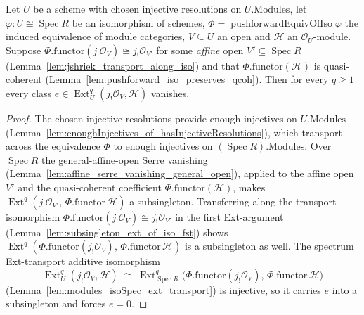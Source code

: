 \begin{lemma}

  \label{lem:ext_jShriekOU_eq_zero_of_specIso}
  Let \(U\) be a scheme with chosen injective resolutions on \(U.\mathrm{Modules}\), let
  \(\varphi : U \cong \operatorname{Spec} R\) be an isomorphism of schemes,
  \(\Phi = \operatorname{pushforwardEquivOfIso}\varphi\) the induced equivalence of module categories,
  \(V \subseteq U\) an open and \(\mathcal{H}\) an \(\mathcal{O}_U\)-module. Suppose
  \(\Phi.\mathrm{functor}(j_!\mathcal{O}_V) \cong j_!\mathcal{O}_{V'}\) for some \emph{affine} open
  \(V' \subseteq \operatorname{Spec} R\) (Lemma~\ref{lem:jshriek_transport_along_iso}) and that
  \(\Phi.\mathrm{functor}(\mathcal{H})\) is quasi-coherent
  (Lemma~\ref{lem:pushforward_iso_preserves_qcoh}). Then for every \(q \geq 1\) every class
  \(e \in \operatorname{Ext}^q_U(j_!\mathcal{O}_V, \mathcal{H})\) vanishes.
\end{lemma}
\begin{proof}
    \leanok
  The chosen injective resolutions provide enough injectives on \(U.\mathrm{Modules}\)
  (Lemma~\ref{lem:enoughInjectives_of_hasInjectiveResolutions}), which transport across the equivalence
  \(\Phi\) to enough injectives on \((\operatorname{Spec} R).\mathrm{Modules}\). Over
  \(\operatorname{Spec} R\) the general-affine-open Serre vanishing
  (Lemma~\ref{lem:affine_serre_vanishing_general_open}), applied to the affine open \(V'\) and the
  quasi-coherent coefficient \(\Phi.\mathrm{functor}(\mathcal{H})\), makes
  \(\operatorname{Ext}^q(j_!\mathcal{O}_{V'},\, \Phi.\mathrm{functor}\,\mathcal{H})\) a subsingleton.
  Transferring along the transport isomorphism
  \(\Phi.\mathrm{functor}(j_!\mathcal{O}_V) \cong j_!\mathcal{O}_{V'}\) in the first Ext-argument
  (Lemma~\ref{lem:subsingleton_ext_of_iso_fst}) shows
  \(\operatorname{Ext}^q(\Phi.\mathrm{functor}(j_!\mathcal{O}_V),\, \Phi.\mathrm{functor}\,\mathcal{H})\)
  is a subsingleton as well. The spectrum Ext-transport additive isomorphism
  \[
    \operatorname{Ext}^q_U(j_!\mathcal{O}_V, \mathcal{H})
      \;\cong\;
    \operatorname{Ext}^q_{\operatorname{Spec} R}\bigl(\Phi.\mathrm{functor}(j_!\mathcal{O}_V),\,
      \Phi.\mathrm{functor}\,\mathcal{H}\bigr)
  \]
  (Lemma~\ref{lem:modules_isoSpec_ext_transport}) is injective, so it carries \(e\) into a subsingleton
  and forces \(e = 0\).
\end{proof}


